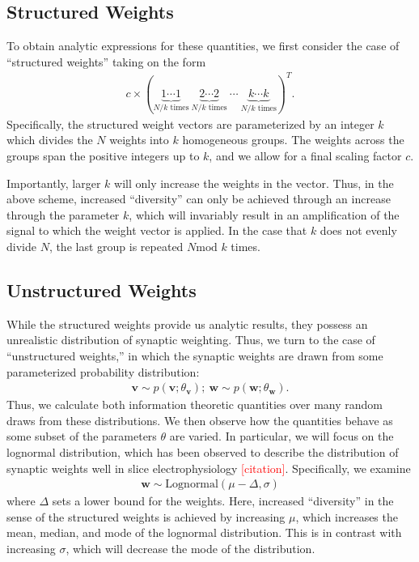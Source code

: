 \documentclass[11pt]{article}
\begin{document}
	\subsection{Structured Weights}
	To obtain analytic expressions for these quantities, we first consider the case of ``structured weights'' taking on the form
	\begin{align}
		c \times \left(\underbrace{1 \cdots 1}_{N/k \text{ times}}  \ \underbrace{2 \cdots 2}_{N/k \text{ times}} \ \cdots \ \underbrace{k \cdots k}_{N/k \text{ times}}   \right)^T.
	\end{align}
	Specifically, the structured weight vectors are parameterized by an integer $k$ which divides the $N$ weights into $k$ homogeneous groups. The weights across the groups span the positive integers up to $k$, and we allow for a final scaling factor $c$. 
	
	Importantly,  larger $k$ will only increase the weights in the vector. Thus, in the above scheme, increased ``diversity'' can only be achieved through an increase through the parameter $k$, which will invariably result in an amplification of the signal to which the weight vector is applied. In the case that $k$ does not evenly divide $N$, the last group is repeated $N\text{mod }k$ times.
	
	\subsection{Unstructured Weights}
	
	While the structured weights provide us analytic results, they possess an unrealistic distribution of synaptic weighting. Thus, we turn to the case of ``unstructured weights,'' in which the synaptic weights are drawn from some parameterized probability distribution:
	\begin{align}
		\mathbf{v} \sim p(\mathbf{v}; \theta_{\mathbf{v}}); \ \mathbf{w} \sim p(\mathbf{w}; \theta_{\mathbf{w}}).
	\end{align}
	Thus, we  calculate both information theoretic quantities over many random draws from these distributions. We then observe how the quantities behave as some subset of the parameters $\theta$ are varied. In particular, we will focus on the lognormal distribution, which has been observed to describe the distribution of synaptic weights well in slice electrophysiology \textcolor{red}{[citation]}. Specifically, we examine 
	\begin{align}
		\mathbf{w}\sim \text{Lognormal}(\mu - \Delta, \sigma)
	\end{align}
	where $\Delta$ sets a lower bound for the weights. Here, increased ``diversity'' in the sense of the structured weights is achieved by increasing $\mu$, which increases the mean, median, and mode of the lognormal distribution. This is in contrast with increasing $\sigma$, which will decrease the mode of the distribution.
	\newpage
	
\end{document}
